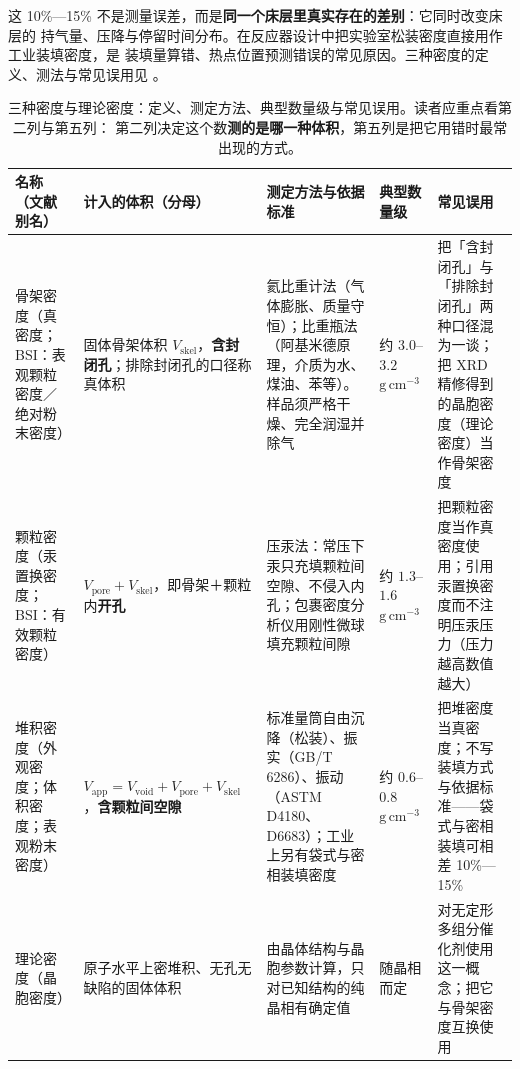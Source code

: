 这 10\%—15\% 不是测量误差，而是\textbf{同一个床层里真实存在的差别}：它同时改变床层的
持气量、压降与停留时间分布。在反应器设计中把实验室松装密度直接用作工业装填密度，是
装填量算错、热点位置预测错误的常见原因。三种密度的定义、测法与常见误用见
。

\begin{table}[htbp]
\centering
\caption{三种密度与理论密度：定义、测定方法、典型数量级与常见误用。读者应重点看第二列与第五列：
第二列决定这个数\textbf{测的是哪一种体积}，第五列是把它用错时最常出现的方式。
}
\label{tab:ch01c-density}
{\srcsize
\begin{tabularx}{\columnwidth}{@{}lXXXX@{}}
\toprule
名称（文献别名） & 计入的体积（分母） & 测定方法与依据标准 & 典型数量级 & 常见误用 \\
\midrule
骨架密度（真密度；BSI：表观颗粒密度／绝对粉末密度） &
固体骨架体积 $V_{\mathrm{skel}}$，\textbf{含封闭孔}；排除封闭孔的口径称真体积 &
氦比重计法（气体膨胀、质量守恒）；比重瓶法（阿基米德原理，介质为水、煤油、苯等）。样品须严格干燥、完全润湿并除气 &
约 $3.0$--$3.2$ $\mathrm{g\,cm^{-3}}$ &
把「含封闭孔」与「排除封闭孔」两种口径混为一谈；把 XRD 精修得到的晶胞密度（理论密度）当作骨架密度 \\
颗粒密度（汞置换密度；BSI：有效颗粒密度） &
$V_{\mathrm{pore}}+V_{\mathrm{skel}}$，即骨架＋颗粒内\textbf{开孔} &
压汞法：常压下汞只充填颗粒间空隙、不侵入内孔；包裹密度分析仪用刚性微球填充颗粒间隙 &
约 $1.3$--$1.6$ $\mathrm{g\,cm^{-3}}$ &
把颗粒密度当作真密度使用；引用汞置换密度而不注明压汞压力（压力越高数值越大） \\
堆积密度（外观密度；体积密度；表观粉末密度） &
$V_{\mathrm{app}}=V_{\mathrm{void}}+V_{\mathrm{pore}}+V_{\mathrm{skel}}$，\textbf{含颗粒间空隙} &
标准量筒自由沉降（松装）、振实（GB/T 6286）、振动（ASTM D4180、D6683）；工业上另有袋式与密相装填密度 &
约 $0.6$--$0.8$ $\mathrm{g\,cm^{-3}}$ &
把堆密度当真密度；不写装填方式与依据标准——袋式与密相装填可相差 10\%—15\% \\
理论密度（晶胞密度） &
原子水平上密堆积、无孔无缺陷的固体体积 &
由晶体结构与晶胞参数计算，只对已知结构的纯晶相有确定值 &
随晶相而定 &
对无定形多组分催化剂使用这一概念；把它与骨架密度互换使用 \\
\bottomrule
\end{tabularx}}
\end{table}

